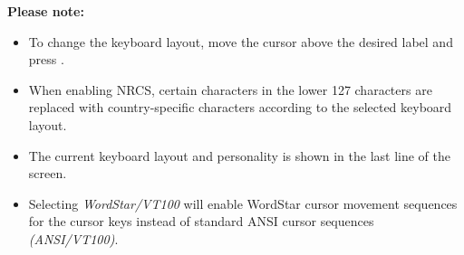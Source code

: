 \textbf{Please note:}
\begin{itemize}
 \item To change the keyboard layout, move the cursor above the desired label and press .
 \item When enabling NRCS, certain characters in the lower 127 characters are replaced with country-specific characters according to the
		selected keyboard layout.
 \item The current keyboard layout and personality is shown in the last line of the screen.
 \item Selecting \textit{WordStar/VT100} will enable WordStar cursor movement sequences for the cursor keys instead of standard ANSI
		cursor sequences \textit{(ANSI/VT100)}.
\end{itemize}

